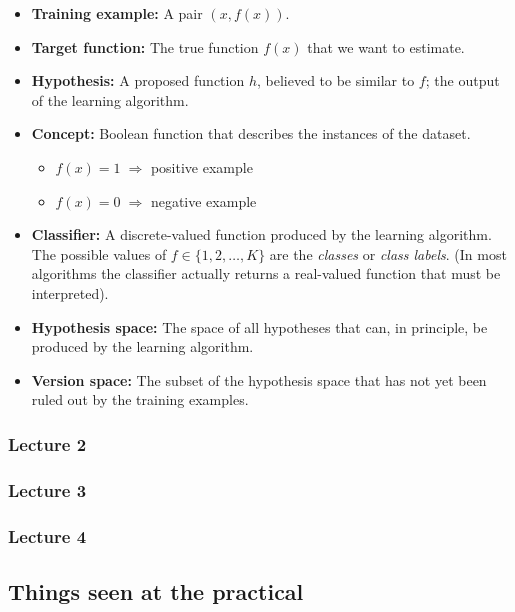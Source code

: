 \begin{itemize}
    \item \textbf{Training example:} A pair $(x, f(x))$.
    \item \textbf{Target function:} The true function $f(x)$ that we want to estimate.
    \item \textbf{Hypothesis:} A proposed function $h$, believed to be similar to $f$; the output of the learning algorithm.
    \item \textbf{Concept:} Boolean function that describes the instances of the dataset.
          \begin{itemize}
              \item $f(x) = 1 \;\Rightarrow$ positive example
              \item $f(x) = 0 \;\Rightarrow$ negative example 
          \end{itemize}
    \item \textbf{Classifier:} A discrete-valued function produced by the learning algorithm.  
          The possible values of $f \in \{1,2,\dots,K\}$ are the \emph{classes} or \emph{class labels}.  
          (In most algorithms the classifier actually returns a real-valued function that must be interpreted).
    \item \textbf{Hypothesis space:} The space of all hypotheses that can, in principle, be produced by the learning algorithm.
    \item \textbf{Version space:} The subset of the hypothesis space that has not yet been ruled out by the training examples.
\end{itemize}


\subsubsection{Lecture 2}
\subsubsection{Lecture 3}
\subsubsection{Lecture 4}

\subsection{Things seen at the practical}
